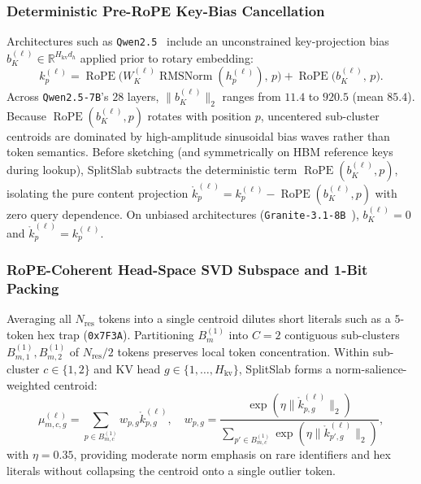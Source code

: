 \documentclass[10pt,journal,compsoc]{IEEEtran}
\theoremstyle{definition}
\theoremstyle{remark}
\newcommand{\SplitSlab}{\textup{\textsc{SplitSlab}}}
\newcommand{\RMSNorm}{\operatorname{RMSNorm}}
\newcommand{\RoPE}{\operatorname{RoPE}}
\newcommand{\R}{\mathbb{R}}
\def\SplitSlab{SplitSlab}%
\begin{document}
\subsubsection{Deterministic Pre-RoPE Key-Bias Cancellation}
Architectures such as \texttt{Qwen2.5}~\cite{yang2024qwen25} include an unconstrained key-projection bias $b_K^{(\ell)} \in \R^{H_{\mathrm{kv}} d_h}$ applied prior to rotary embedding:
\begin{equation}\label{eq:kbias}
k_p^{(\ell)} = \RoPE\!\big(W_K^{(\ell)} \RMSNorm(h_p^{(\ell)}),\, p\big) + \RoPE\!\big(b_K^{(\ell)},\, p\big).
\end{equation}
Across \texttt{Qwen2.5-7B}'s $28$ layers, $\|b_K^{(\ell)}\|_2$ ranges from $11.4$ to $920.5$ (mean $85.4$). Because $\RoPE(b_K^{(\ell)}, p)$ rotates with position $p$, uncentered sub-cluster centroids are dominated by high-amplitude sinusoidal bias waves rather than token semantics. Before sketching (and symmetrically on HBM reference keys during lookup), \SplitSlab{} subtracts the deterministic term $\RoPE(b_K^{(\ell)}, p)$, isolating the pure content projection $\mathring{k}_p^{(\ell)} = k_p^{(\ell)} - \RoPE(b_K^{(\ell)}, p)$ with zero query dependence. On unbiased architectures (\texttt{Granite-3.1-8B}~\cite{mishra2024granite}), $b_K^{(\ell)} = 0$ and $\mathring{k}_p^{(\ell)} = k_p^{(\ell)}$.

\subsubsection{RoPE-Coherent Head-Space SVD Subspace and 1-Bit Packing}
Averaging all $N_{\mathrm{res}}$ tokens into a single centroid dilutes short literals such as a $5$-token hex trap (\texttt{0x7F3A}). Partitioning $B_m^{(1)}$ into $C = 2$ contiguous sub-clusters $B_{m,1}^{(1)}, B_{m,2}^{(1)}$ of $N_{\mathrm{res}}/2$ tokens preserves local token concentration. Within sub-cluster $c \in \{1,2\}$ and KV head $g \in \{1,\dots,H_{\mathrm{kv}}\}$, \SplitSlab{} forms a norm-salience-weighted centroid:
\begin{equation}\label{eq:centroid}
\mu_{m,c,g}^{(\ell)} = \sum_{p \in B_{m,c}^{(1)}} w_{p,g} \mathring{k}_{p,g}^{(\ell)}, \quad
w_{p,g} = \frac{\exp(\eta \|\mathring{k}_{p,g}^{(\ell)}\|_2)}{\sum_{p' \in B_{m,c}^{(1)}} \exp(\eta \|\mathring{k}_{p',g}^{(\ell)}\|_2)},
\end{equation}
with $\eta = 0.35$, providing moderate norm emphasis on rare identifiers and hex literals without collapsing the centroid onto a single outlier token.
\end{document}
